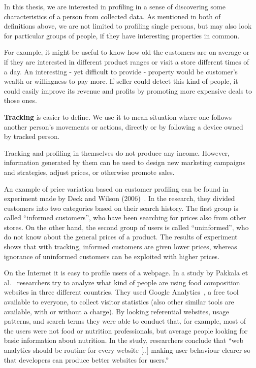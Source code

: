 \documentclass[12pt,a4paper,oneside,pdftex]{report}
\begin{document}
In this thesis, we are interested in profiling in a sense of discovering some characteristics of a person from collected data. As mentioned in both of definitions above, we are not limited to profiling single persons, but may also look for particular groups of people, if they have interesting properties in common.

For example, it might be useful to know how old the customers are on average or if they are interested in different product ranges or visit a store different times of a day. An interesting - yet difficult to provide - property would be customer's wealth or willingness to pay more. If seller could detect this kind of people, it could easily improve its revenue and profits by promoting more expensive deals to those ones.

\textbf{Tracking} is easier to define. We use it to mean situation where one follows another person's movements or actions, directly or by following a device owned by tracked person. 

Tracking and profiling in themselves do not produce any income. However, information generated by them can be used to design new marketing campaigns and strategies, adjust prices, or otherwise promote sales.

An example of price variation based on customer profiling can be found in experiment made by Deck and Wilson (2006)~\cite{Deck2006}. In the research, they divided customers into two categories based on their search history. The first group is called ``informed customers'', who have been searching for prices also from other stores. On the other hand, the second group of users is called ``uninformed'', who do not know about the general prices of a product. The results of experiment shows that with tracking, informed customers are given lower prices, whereas ignorance of uninformed customers can be exploited with higher prices.

On the Internet it is easy to profile users of a webpage. In a study by Pakkala et al.~\cite{Pakkala2012504} researchers try to analyze what kind of people are using food composition websites in three different countries. They used Google Analytics~\cite{googleanalytics}, a free tool available to everyone, to collect visitor statistics (also other similar tools are available, with or without a charge). By looking referential websites, usage patterns, and search terms they were able to conduct that, for example, most of the users were not food or nutrition professionals, but average people looking for basic information about nutrition. In the study, researchers conclude that ``web analytics should be routine for every website [..] making user behaviour clearer so that developers can produce better websites for users.''
\end{document}

